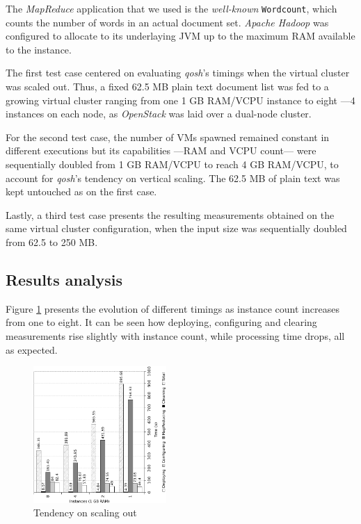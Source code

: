 \documentclass{sig-alternate}
\begin{document}
The \emph{MapReduce} application that we used is the \emph{well-known} \texttt{Wordcount}, which counts the number of words in an actual document set. \emph{Apache Hadoop} was configured to allocate to its underlaying JVM up to the maximum RAM available to the instance.

The first test case centered on evaluating \emph{qosh}'s timings when the virtual cluster was scaled out. Thus, a fixed 62.5 MB plain text document list was fed to a growing virtual cluster ranging from one 1 GB RAM/VCPU instance to eight ---4 instances on each node, as \emph{OpenStack} was laid over a dual-node cluster.

For the second test case, the number of VMs spawned remained constant in different executions but its capabilities ---RAM and VCPU count--- were sequentially doubled from 1 GB RAM/VCPU to reach 4 GB RAM/VCPU, to account for \emph{qosh}'s tendency on vertical scaling. The 62.5 MB of plain text was kept untouched as on the first case.

Lastly, a third test case presents the resulting measurements obtained on the same virtual cluster configuration, when the input size was sequentially doubled from 62.5 to 250 MB.

\subsection{Results analysis}
\noindent Figure \ref{fig:scaleout} presents the evolution of different timings as instance count increases from one to eight. It can be seen how deploying, configuring and clearing measurements rise slightly with instance count, while processing time drops, all as expected.

\begin{figure}[htp]
\centering
\includegraphics[width=0.45\textwidth]{img/007}
\caption{Tendency on scaling out}
\label{fig:scaleout}
\end{figure}
\end{document}
